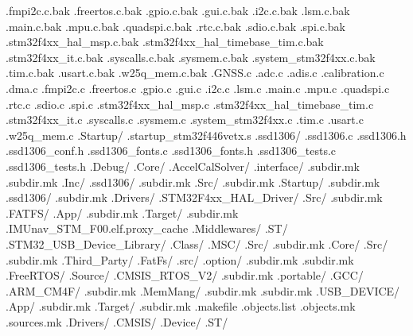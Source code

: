 \documentclass{article}
\begin{document}
{          .fmpi2c.c.bak
          .freertos.c.bak
          .gpio.c.bak
          .gui.c.bak
          .i2c.c.bak
          .lsm.c.bak
          .main.c.bak
          .mpu.c.bak
          .quadspi.c.bak
          .rtc.c.bak
          .sdio.c.bak
          .spi.c.bak
          .stm32f4xx_hal_msp.c.bak
          .stm32f4xx_hal_timebase_tim.c.bak
          .stm32f4xx_it.c.bak
          .syscalls.c.bak
          .sysmem.c.bak
          .system_stm32f4xx.c.bak
          .tim.c.bak
          .usart.c.bak
          .w25q_mem.c.bak
        .GNSS.c
        .adc.c
        .adis.c
        .calibration.c
        .dma.c
        .fmpi2c.c
        .freertos.c
        .gpio.c
        .gui.c
        .i2c.c
        .lsm.c
        .main.c
        .mpu.c
        .quadspi.c
        .rtc.c
        .sdio.c
        .spi.c
        .stm32f4xx_hal_msp.c
        .stm32f4xx_hal_timebase_tim.c
        .stm32f4xx_it.c
        .syscalls.c
        .sysmem.c
        .system_stm32f4xx.c
        .tim.c
        .usart.c
        .w25q_mem.c
      .Startup/
        .startup_stm32f446vetx.s
      .ssd1306/
        .ssd1306.c
        .ssd1306.h
        .ssd1306_conf.h
        .ssd1306_fonts.c
        .ssd1306_fonts.h
        .ssd1306_tests.c
        .ssd1306_tests.h
    .Debug/
      .Core/
        .AccelCalSolver/
          .interface/
            .subdir.mk
          .subdir.mk
        .Inc/
          .ssd1306/
            .subdir.mk
        .Src/
          .subdir.mk
        .Startup/
          .subdir.mk
        .ssd1306/
          .subdir.mk
      .Drivers/
        .STM32F4xx_HAL_Driver/
          .Src/
            .subdir.mk
      .FATFS/
        .App/
          .subdir.mk
        .Target/
          .subdir.mk
      .IMUnav_STM_F00.elf.proxy_cache
      .Middlewares/
        .ST/
          .STM32_USB_Device_Library/
            .Class/
              .MSC/
                .Src/
                  .subdir.mk
            .Core/
              .Src/
                .subdir.mk
        .Third_Party/
          .FatFs/
            .src/
              .option/
                .subdir.mk
              .subdir.mk
          .FreeRTOS/
            .Source/
              .CMSIS_RTOS_V2/
                .subdir.mk
              .portable/
                .GCC/
                  .ARM_CM4F/
                    .subdir.mk
                .MemMang/
                  .subdir.mk
              .subdir.mk
      .USB_DEVICE/
        .App/
          .subdir.mk
        .Target/
          .subdir.mk
      .makefile
      .objects.list
      .objects.mk
      .sources.mk
    .Drivers/
      .CMSIS/
        .Device/
          .ST/
}
\end{document}
